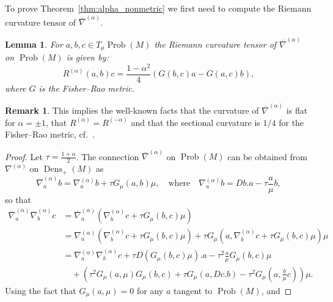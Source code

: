 \documentclass[11pt,reqno]{amsart}
\newtheorem{lemma}[theorem]{Lemma}
\theoremstyle{definition}
\newtheorem{remark}[theorem]{Remark}
\newcommand{\Prob}{\operatorname{Prob}(M)}
\newcommand{\Dens}{\operatorname{Dens}_+(M)}
\newcommand{\GFR}{G}
\newcommand{\na}{\nabla^{(\alpha)}}
\newcommand{\nabar}{\overline{\nabla}^{(\alpha)}}
\begin{document}
To prove Theorem~\ref{thm:alpha_nonmetric} we first need to compute the Riemann curvature tensor of $\nabar$.
\begin{lemma}\label{prop:alpha-curvature}
For $a,b,c\in T_{\mu}\Prob$  the Riemann curvature tensor of $\nabar$ on $\Prob$ is given by:
    $$R^{(\alpha)}(a,b)c=\frac{1-\alpha^2}{4}\left(\GFR(b,c)a-\GFR(a,c)b\right),$$
    where $\GFR$ is the Fisher--Rao metric.
\end{lemma}
\begin{remark}
This implies the well-known %
facts that the curvature of $\nabar$ is flat for $\alpha=\pm 1$, that $R^{(\alpha)}=R^{(-\alpha)}$ and that the sectional curvature is $1/4$ for the Fisher--Rao metric, cf.~\cite[Appendix B]{ay2017information}.
\end{remark}
\begin{proof}
Let $\tau = \frac{1+\alpha}{2}$. %
The connection $\nabar$ on $\Prob$ can be obtained from $\na$ on $\Dens$ as
$$\nabar_ab=\na_ab+\tau\GFR_{\mu}(a,b)\mu, \quad\text{where}\quad \na_ab=Db.a-\tau\frac{a}{\mu}b,$$
so that
\begin{align*}
\nabar_a\nabar_bc&=\nabar_a\left(\na_bc+\tau\GFR_{\mu}(b,c)\mu\right)\\
&=\na_a\left(\na_bc+\tau\GFR_{\mu}(b,c)\mu\right)+\tau\GFR_\mu\left(a, \na_bc+\tau\GFR_{\mu}(b,c)\mu\right)\mu\\
&=\na_a\na_bc+\tau D\left(\GFR_{\mu}(b,c)\mu\right).a-\tau^2\frac{a}{\mu}\GFR_{\mu}(b,c)\mu\\
&\quad+\left(\tau^2\GFR_{\mu}(a,\mu)\GFR_{\mu}(b,c)+\tau\GFR_{\mu}(a,Dc.b)-\tau^2\GFR_{\mu}(a,\frac{b}{\mu}c)\right)\mu.
\end{align*}
Using the fact that $\GFR_{\mu}(a,\mu)=0$ for any $a$ tangent to $\Prob$, and

\end{proof}
\end{document}
